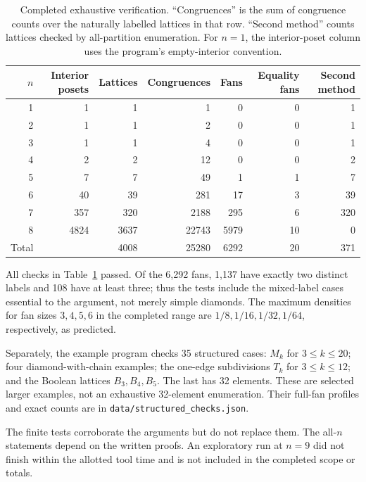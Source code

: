 \documentclass[11pt,a4paper]{article}
\numberwithin{equation}{section}
\theoremstyle{definition}
\theoremstyle{remark}
\begin{document}
\begin{table}[htbp]
\centering\small
\begin{tabular}{@{}rrrrrrr@{}}
\toprule
$n$ & Interior posets & Lattices & Congruences & Fans & Equality fans & Second method\\
\midrule
1&1&1&1&0&0&1\\
2&1&1&2&0&0&1\\
3&1&1&4&0&0&1\\
4&2&2&12&0&0&2\\
5&7&7&49&1&1&7\\
6&40&39&281&17&3&39\\
7&357&320&2188&295&6&320\\
8&4824&3637&22743&5979&10&0\\
\midrule
Total & &4008&25280&6292&20&371\\
\bottomrule
\end{tabular}
\caption{Completed exhaustive verification. ``Congruences'' is the sum of
congruence counts over the naturally labelled lattices in that row.
``Second method'' counts lattices checked by all-partition enumeration.
For $n=1$, the interior-poset column uses the program's empty-interior convention.}
\label{tab:verification}
\end{table}

All checks in Table~\ref{tab:verification} passed.
Of the 6,292 fans, 1,137 have exactly two distinct labels and 108 have at least
three; thus the tests include the mixed-label cases essential to the argument,
not merely simple diamonds.
The maximum densities for fan sizes $3,4,5,6$ in the completed range are
$1/8,1/16,1/32,1/64$, respectively, as predicted.

Separately, the example program checks 35 structured cases: $M_k$ for
$3\le k\le20$; four diamond-with-chain examples; the one-edge subdivisions
$T_k$ for $3\le k\le12$; and the Boolean lattices $B_3,B_4,B_5$.
The last has 32 elements. These are selected larger examples, not an exhaustive
32-element enumeration. Their full-fan profiles and exact counts are in
\texttt{data/structured\_checks.json}.

The finite tests corroborate the arguments but do not replace them.
The all-$n$ statements depend on the written proofs. An exploratory run at
$n=9$ did not finish within the allotted tool time and is not included in the
completed scope or totals.
\end{document}
